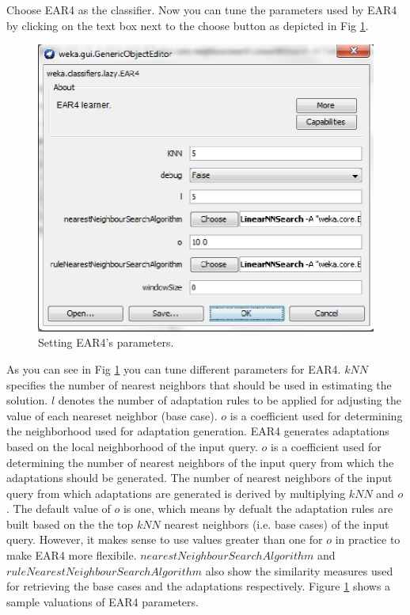 \documentclass[a4paper]{article}
\begin{document}
Choose EAR4 as the classifier.
Now you can tune the parameters used by EAR4 by clicking on the text box next to the choose button 
as depicted in Fig \ref{fig:ear4Parameters}.

\begin{figure}[htb]
  \begin{center}
  \includegraphics[scale=0.5]{figures/ear4Parameters.eps}
  \caption{Setting EAR4's parameters.}
  \label{fig:ear4Parameters}
  \end{center}
\end{figure}


As you can see in Fig \ref{fig:ear4Parameters} you can tune different parameters for EAR4. $kNN$ 
specifies the number of nearest neighbors that should be used in estimating the solution.
$l$ denotes the number of adaptation rules to be applied for adjusting the value of each neareset neighbor (base case).
$o$ is a coefficient used for determining the neighborhood used for adaptation generation. 
EAR4 generates adaptations based on the local neighborhood of the input query.
$o$ is a coefficient used for determining the number of nearest neighbors of 
the input query from which the adaptations should be generated. The number of
nearest neighbors of the input query from which adaptations are generated is derived by 
multiplying $kNN$ and $o$. The default value of $o$ is one, which means by defualt
the adaptation rules are built based on the the top $kNN$ nearest neighbors (i.e. base cases) of the input query. 
However, it makes sense to use values greater than one for $o$ in practice to make EAR4 more 
flexibile. $nearestNeighbourSearchAlgorithm$ and $ruleNearestNeighbourSearchAlgorithm$ also show the similarity measures 
used for retrieving the base cases and the adaptations respectively.
Figure \ref{fig:ear4Parameters} shows a sample valuations of EAR4 parameters. 
\end{document}
